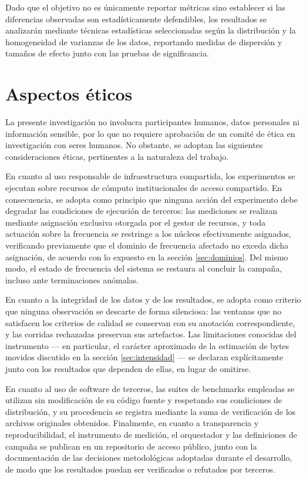 \documentclass[12pt,oneside,spanish]{book}
\begin{document}
Dado que el objetivo no es únicamente reportar métricas sino establecer si las diferencias observadas son estadísticamente defendibles, los resultados se analizarán mediante técnicas estadísticas seleccionadas según la distribución y la homogeneidad de varianzas de los datos, reportando medidas de dispersión y tamaños de efecto junto con las pruebas de significancia.

\section{Aspectos éticos}

La presente investigación no involucra participantes humanos, datos personales ni información sensible, por lo que no requiere aprobación de un comité de ética en investigación con seres humanos. No obstante, se adoptan las siguientes consideraciones éticas, pertinentes a la naturaleza del trabajo.

En cuanto al uso responsable de infraestructura compartida, los experimentos se ejecutan sobre recursos de cómputo institucionales de acceso compartido. En consecuencia, se adopta como principio que ninguna acción del experimento debe degradar las condiciones de ejecución de terceros: las mediciones se realizan mediante asignación exclusiva otorgada por el gestor de recursos, y toda actuación sobre la frecuencia se restringe a los núcleos efectivamente asignados, verificando previamente que el dominio de frecuencia afectado no exceda dicha asignación, de acuerdo con lo expuesto en la sección \ref{sec:dominios}. Del mismo modo, el estado de frecuencia del sistema se restaura al concluir la campaña, incluso ante terminaciones anómalas.

En cuanto a la integridad de los datos y de los resultados, se adopta como criterio que ninguna observación se descarte de forma silenciosa: las ventanas que no satisfacen los criterios de calidad se conservan con su anotación correspondiente, y las corridas rechazadas preservan sus artefactos. Las limitaciones conocidas del instrumento --- en particular, el carácter aproximado de la estimación de bytes movidos discutido en la sección \ref{sec:intensidad} --- se declaran explícitamente junto con los resultados que dependen de ellas, en lugar de omitirse.

En cuanto al uso de software de terceros, las suites de benchmarks empleadas se utilizan sin modificación de su código fuente y respetando sus condiciones de distribución, y su procedencia se registra mediante la suma de verificación de los archivos originales obtenidos. Finalmente, en cuanto a transparencia y reproducibilidad, el instrumento de medición, el orquestador y las definiciones de campaña se publican en un repositorio de acceso público, junto con la documentación de las decisiones metodológicas adoptadas durante el desarrollo, de modo que los resultados puedan ser verificados o refutados por terceros.
\end{document}
